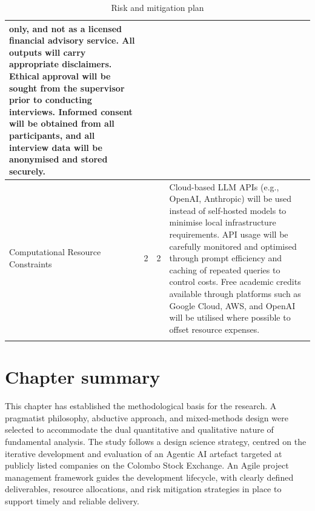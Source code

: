\begin{longtable}{|p{3.5cm}|p{0.5cm}|p{0.5cm}|p{10cm}|}
    only, and not as a licensed financial advisory service. All
    outputs will carry appropriate disclaimers. Ethical approval
    will be sought from the supervisor prior to conducting
    interviews. Informed consent will be obtained from all
    participants, and all interview data will be anonymised
    and stored securely. \\
    \hline
    Computational Resource Constraints & 2 & 2 &
    Cloud-based LLM APIs (e.g., OpenAI, Anthropic) will be used
    instead of self-hosted models to minimise local infrastructure
    requirements. API usage will be carefully monitored and
    optimised through prompt efficiency and caching of repeated
    queries to control costs. Free academic credits available
    through platforms such as Google Cloud, AWS, and OpenAI
    will be utilised where possible to offset resource expenses. \\
    \hline
    \caption{Risk and mitigation plan}
    \label{tab:risk-mitigation}
\end{longtable}

\section{Chapter summary}

This chapter has established the methodological basis for the research. A pragmatist philosophy, abductive approach, and mixed-methods design were selected to accommodate the dual quantitative and qualitative nature of fundamental analysis. The study follows a design science strategy, centred on the iterative development and evaluation of an Agentic AI artefact targeted at publicly listed companies on the Colombo Stock Exchange. An Agile project management framework guides the development lifecycle, with clearly defined deliverables, resource allocations, and risk mitigation strategies in place to support timely and reliable delivery.
